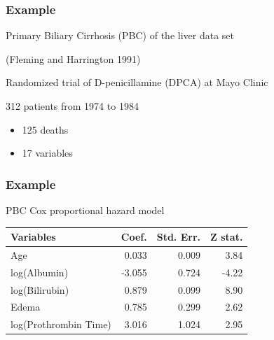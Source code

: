 \documentclass[xcolor=svgnames]{beamer}\usepackage[]{graphicx}\usepackage[]{color}
\newenvironment{knitrout}{}{} %
\begin{document}
\begin{frame}
\frametitle{Example}
Primary Biliary Cirrhosis (PBC) of the liver data set

(Fleming and Harrington 1991)

Randomized  trial of D-penicillamine (DPCA) at Mayo Clinic

312 patients from 1974 to 1984
\begin{itemize}
\item 125 deaths
\item 17 variables
\end{itemize}

\end{frame}
\begin{frame}
\frametitle{Example}

PBC Cox proportional hazard model

\begin{knitrout}\footnotesize
{}\color{fgcolor}
\begin{tabular}{lrrr}
\toprule
Variables & Coef. & Std. Err. & Z stat.\\
\midrule
Age & 0.033 & 0.009 & 3.84\\
log(Albumin) & -3.055 & 0.724 & -4.22\\
log(Bilirubin) & 0.879 & 0.099 & 8.90\\
Edema & 0.785 & 0.299 & 2.62\\
log(Prothrombin Time) & 3.016 & 1.024 & 2.95\\
\bottomrule
\end{tabular}


\end{knitrout}
\end{frame}
\end{document}
